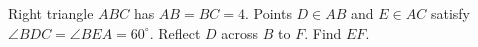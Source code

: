 Right triangle $ABC$ has $AB=BC=4$. Points $D\in AB$ and $E\in AC$ satisfy $\angle BDC=\angle BEA=60^\circ$. Reflect $D$ across $B$ to $F$. Find $EF$.
